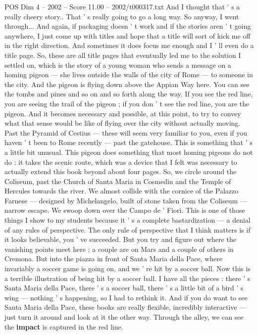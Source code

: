 \begin{textsample}{POS Dim 4 – 2002 – Score 11.00 – 2002/t000317.txt}
And I thought that ' s a really cheery story..
That ' s really going to go a long way.
So anyway, I went through...
And again, if packaging doesn ' t work and if the stories aren ' t going anywhere, I just come up with titles and hope that a title will sort of kick me off in the right direction.
And sometimes it does focus me enough and I ' ll even do a title page.
So, these are all title pages that eventually led me to the solution I settled on, which is the story of a young woman who sends a message on a homing pigeon — she lives outside the walls of the city of Rome — to someone in the city.
And the pigeon is flying down above the Appian Way here.
You can see the tombs and pines and so on and so forth along the way.
If you see the red line, you are seeing the trail of the pigeon ; if you don ' t see the red line, you are the pigeon.
And it becomes necessary and possible, at this point, to try to convey what that sense would be like of flying over the city without actually moving.
Past the Pyramid of Cestius — these will seem very familiar to you, even if you haven ' t been to Rome recently — past the gatehouse.
This is something that ' s a little bit unusual.
This pigeon does something that most homing pigeons do not do : it takes the scenic route, which was a device that I felt was necessary to actually extend this book beyond about four pages.
So, we circle around the Coliseum, past the Church of Santa Maria in Cosmedin and the Temple of Hercules towards the river.
We almost collide with the cornice of the Palazzo Farnese — designed by Michelangelo, built of stone taken from the Coliseum — narrow escape.
We swoop down over the Campo de ' Fiori.
This is one of those things I show to my students because it ' s a complete bastardization — a denial of any rules of perspective.
The only rule of perspective that I think matters is if it looks believable, you ' ve succeeded.
But you try and figure out where the vanishing points meet here ; a couple are on Mars and a couple of others in Cremona.
But into the piazza in front of Santa Maria della Pace, where invariably a soccer game is going on, and we ' re hit by a soccer ball.
Now this is a terrible illustration of being hit by a soccer ball.
I have all the pieces : there ' s Santa Maria della Pace, there ' s a soccer ball, there ' s a little bit of a bird ' s wing — nothing ' s happening, so I had to rethink it.
And if you do want to see Santa Maria della Pace, these books are really flexible, incredibly interactive — just turn it around and look at it the other way.
Through the alley, we can see the \textbf{impact} is captured in the red line.

\end{textsample}
